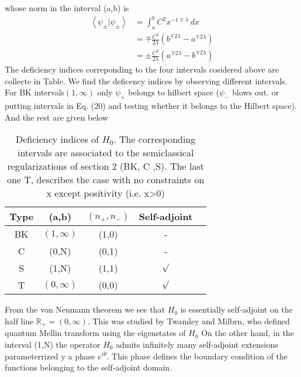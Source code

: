 \documentclass[12pt, letterpaper]{article}
\newcommand*{\1}{\hspace{1pt}}
\begin{document}
        whose norm in the interval (a,b) is
        \begin{equation}
            \begin{split}
            \left\langle \psi_{\pm} | \psi_{\pm} \right\rangle &= \int_{a}^{b} C^{2} x^{-1\mp \lambda} \,dx \\
            &= \mp \frac{C^{2}}{2\lambda}\left(b^{\mp 2\lambda} - a^{\mp 2\lambda}\right) \\  
            &= \pm \frac{C^{2}}{2\lambda}\left(a^{\mp 2\lambda} - b^{\mp 2\lambda}\right) 
            \end{split}
        \end{equation}
        The deficiency indices correponding to the four intervals cosidered above are collecte in Table\cite{s8}. We find the deficency indices by observing different intervals.
        For BK intervals$(1,\infty)$ only $\psi_{+}$ belongs to hilbert space ($\psi_{-}$ blows out. or putting intervals in Eq. (20) and testing whether it belongs to
        the Hilbert space)\cite{s7}. And the rest are given below
        
        \begin{longtable}[c]{c c c c c}
            \caption{Deficiency indices of $H_{0}$. The corresponding intervals are associated to the semiclassical regularizations of section 2 (BK, C ,S).
            The last one T, describes the case with no constraints on x except positivity (i.e. x>0)} \\
            \hline
             Type & (a,b) & $(n_{+}, n_{-})$ & Self-adjoint\\
             \hline 
             BK & $(1,\infty)$ & (1,0) & -\\  
             C & (0,N) & (0,1) &  -\\ 
             S & (1,N) & (1,1) & $\surd$ \\ 
             T & $(0,\infty)$ & (0,0) & $\surd $\\ 
            \hline
        \end{longtable}


        From the von Neumann theorem we see that $H_{0}$ is essentially self-adjoint on the half line $\mathbb{R} _{+} = (0, \infty)$. This was studied by Twamley and Milbrn, who
        defined quantum Mellin transform using the eigenstates of $H_{0}$\cite{s9}
        On the other hand, in the interval (1,N) the operator $H_{0}$ admits infinitely many self-adjoint extensions parameterrized y a phase $e^{i\theta}$. This phase defines the 
        boundary condition of the functions belonging to the self-adjoint domain.\cite{s7}
\end{document}
